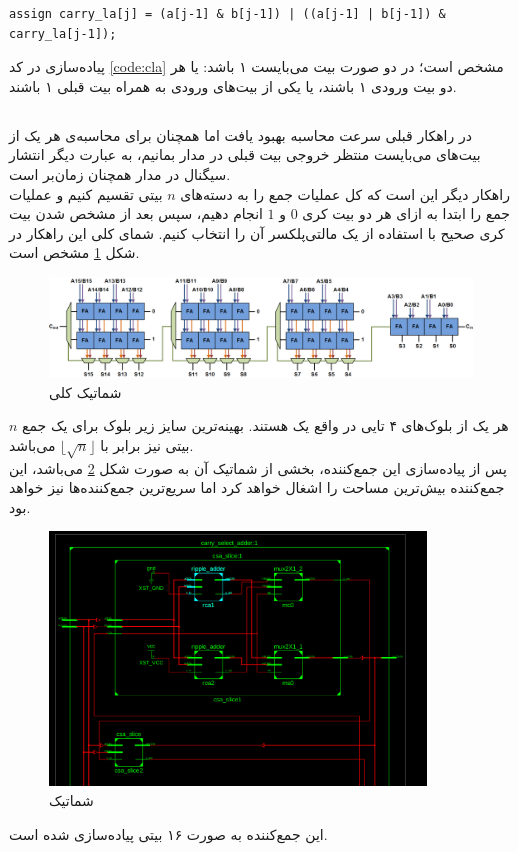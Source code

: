 \documentclass{article}
\begin{document}
\begin{LTR}
\begin{lstlisting}[caption={\rl{پیاده‌سازی \lr{Carry-Lookahead}}​},label=code:cla,style=verilog]
assign carry_la[j] = (a[j-1] & b[j-1]) | ((a[j-1] | b[j-1]) & carry_la[j-1]);
\end{lstlisting}
\end{LTR}
\noindent
پیاده‌سازی  در کد \ref{code:cla} مشخص است؛ در دو صورت بیت  می‌بایست ۱ باشد: یا هر دو بیت ورودی ۱ باشند، یا یکی از بیت‌های ورودی به همراه بیت  قبلی ۱ باشند.

\pagebreak
\subsection{}
در راهکار قبلی سرعت محاسبه بهبود یافت اما همچنان برای محاسبه‌ی هر یک از بیت‌های  می‌بایست منتظر خروجی بیت  قبلی در مدار  بمانیم، به عبارت دیگر انتشار سیگنال در مدار  همچنان زمان‌بر است.\\
راهکار دیگر این است که کل عملیات جمع را به دسته‌های $n$ بیتی تقسیم کنیم و عملیات جمع را ابتدا به ازای هر دو بیت کری $0$ و $1$ انجام دهیم، سپس بعد از مشخص شدن بیت کری صحیح با استفاده از یک مالتی‌پلکسر آن را انتخاب کنیم. شمای کلی این راهکار در شکل \ref{fig:carry-select-schematic} مشخص است.
\begin{figure}[H]
\centering
\includegraphics[width=16cm]{Carry-select-adder}
\caption{شماتیک کلی }
\label{fig:carry-select-schematic}
\end{figure}
\noindent
هر یک از بلوک‌های ۴ تایی در واقع یک  هستند. بهینه‌ترین سایز زیر بلوک برای یک جمع $n$ بیتی نیز برابر با
$\lfloor \sqrt{n} \rfloor$
می‌باشد.\\
پس از پیاده‌سازی این جمع‌کننده، بخشی از شماتیک  آن به صورت شکل \ref{fig:carry-select-adder-rtl} می‌باشد، این جمع‌کننده بیش‌ترین مساحت را اشغال خواهد کرد اما سریع‌ترین جمع‌کننده‌ها نیز خواهد بود.
\begin{figure}[H]
\centering
\includegraphics[width=10cm]{carry-select-adder-rtl}
\caption{شماتیک }
\label{fig:carry-select-adder-rtl}
\end{figure}
\noindent
این جمع‌کننده به صورت ۱۶ بیتی پیاده‌سازی شده است.
\pagebreak
\end{document}
